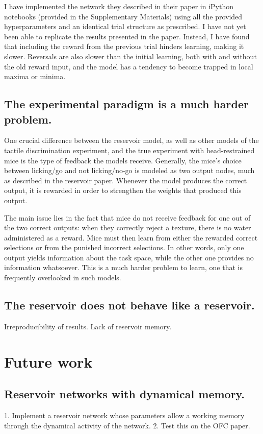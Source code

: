 \documentclass[]{article}
\begin{document}
I have implemented the network they described in their paper in iPython notebooks (provided in the Supplementary Materials) using all the provided hyperparameters and an identical trial structure as prescribed.  I have not yet been able to replicate the results presented in the paper.  Instead, I have found that including the reward from the previous trial hinders learning, making it slower.  Reversals are also slower than the initial learning, both with and without the old reward input, and the model has a tendency to become trapped in local maxima or minima.

\subsection{The experimental paradigm is a much harder problem.}
One crucial difference between the reservoir model, as well as other models of the tactile discrimination experiment, and the true experiment with head-restrained mice is the type of feedback the models receive.  Generally, the mice's choice between licking/go and not licking/no-go is modeled as two output nodes, much as described in the reservoir paper.  Whenever the model produces the correct output, it is rewarded in order to strengthen the weights that produced this output.  

The main issue lies in the fact that mice do not receive feedback for one out of the two correct outputs: when they correctly reject a texture, there is no water administered as a reward.  Mice must then learn from either the rewarded correct selections or from the punished incorrect selections.  In other words, only one output yields information about the task space, while the other one provides no information whatsoever.  This is a much harder problem to learn, one that is frequently overlooked in such models.


\subsection{The reservoir does not behave like a reservoir.}
Irreproducibility of results.
Lack of reservoir memory.

\section{Future work}

\subsection{Reservoir networks with dynamical memory.}
1. Implement a reservoir network whose parameters allow a working memory through the dynamical activity of the network.
2. Test this on the OFC paper.
\end{document}

